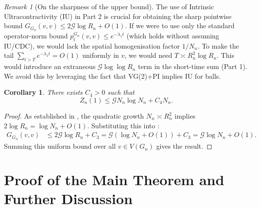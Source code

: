 \documentclass{article}
\numberwithin{equation}{section}
\newtheorem{corollary}[theorem]{Corollary}
\theoremstyle{definition}
\theoremstyle{remark}
\newtheorem{remark}[theorem]{Remark}
\newcommand{\cG}{\mathcal{G}}
\begin{document}
\begin{remark}[On the sharpness of the upper bound]
The use of Intrinsic Ultracontractivity (IU) in Part 2 is crucial for obtaining the sharp pointwise bound $G_{G_n}(v,v)\le 2\cG\log R_n+O(1)$. If we were to use only the standard operator-norm bound $p_t^{G_n}(v,v) \le e^{-\lambda_1 t}$ (which holds without assuming IU/CDC), we would lack the spatial homogenisation factor $1/N_n$. To make the tail $\sum_{t>T} e^{-\lambda_1 t} = O(1)$ uniformly in $v$, we would need $T \asymp R_n^2 \log R_n$. This would introduce an extraneous $\cG \log\log R_n$ term in the short-time sum (Part 1). We avoid this by leveraging the fact that VG(2)+PI implies IU for balls.
\end{remark}


\begin{corollary}\label{cor:upper}
There exists $C_4 > 0$ such that
\[
Z_n(1) \leq \cG N_n \log N_n + C_4 N_n.
\]
\end{corollary}

\begin{proof}
As established in , the quadratic growth $N_n \asymp R_n^2$ implies $2\log R_n = \log N_n + O(1)$. Substituting this into :
\begin{align*}
G_{G_n}(v,v) &\leq 2\cG \log R_n + C_3 = \cG (\log N_n + O(1)) + C_3 = \cG \log N_n + O(1).
\end{align*}
Summing this uniform bound over all $v \in V(G_n)$ gives the result.
\end{proof}

\section{Proof of the Main Theorem and Further Discussion}\label{sec:discussion}
\end{document}
